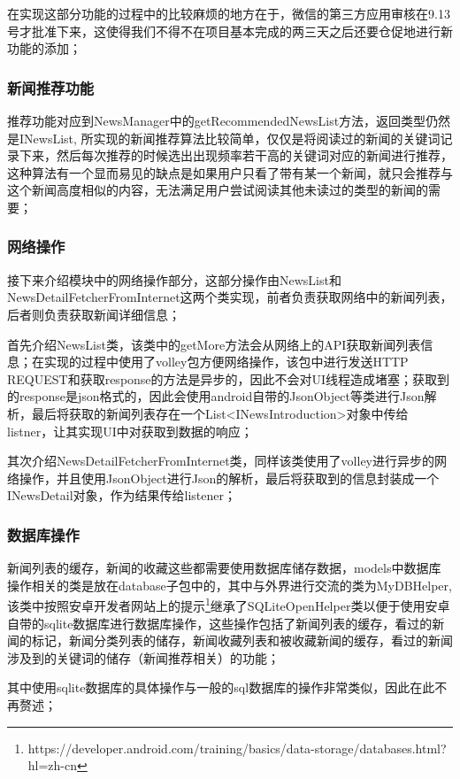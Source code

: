 \documentclass[UTF8]{ctexart}
\begin{document}
		在实现这部分功能的过程中的比较麻烦的地方在于，微信的第三方应用审核在9.13号才批准下来，这使得我们不得不在项目基本完成的两三天之后还要仓促地进行新功能的添加；

	\subsubsection{新闻推荐功能}
		推荐功能对应到NewsManager中的getRecommendedNewsList方法，返回类型仍然是INewsList, 所实现的新闻推荐算法比较简单，仅仅是将阅读过的新闻的关键词记录下来，然后每次推荐的时候选出出现频率若干高的关键词对应的新闻进行推荐，这种算法有一个显而易见的缺点是如果用户只看了带有某一个新闻，就只会推荐与这个新闻高度相似的内容，无法满足用户尝试阅读其他未读过的类型的新闻的需要；

	\subsubsection{网络操作}
		接下来介绍模块中的网络操作部分，这部分操作由NewsList和NewsDetailFetcherFromInternet这两个类实现，前者负责获取网络中的新闻列表，后者则负责获取新闻详细信息；

		首先介绍NewsList类，该类中的getMore方法会从网络上的API获取新闻列表信息；在实现的过程中使用了volley包方便网络操作，该包中进行发送HTTP REQUEST和获取response的方法是异步的，因此不会对UI线程造成堵塞；获取到的response是json格式的，因此会使用android自带的JsonObject等类进行Json解析，最后将获取的新闻列表存在一个List<INewsIntroduction>对象中传给listner，让其实现UI中对获取到数据的响应；

		其次介绍NewsDetailFetcherFromInternet类，同样该类使用了volley进行异步的网络操作，并且使用JsonObject进行Json的解析，最后将获取到的信息封装成一个INewsDetail对象，作为结果传给listener；

	\subsubsection{数据库操作}
		新闻列表的缓存，新闻的收藏这些都需要使用数据库储存数据，models中数据库操作相关的类是放在database子包中的，其中与外界进行交流的类为MyDBHelper, 该类中按照安卓开发者网站上的提示\footnote{https://developer.android.com/training/basics/data-storage/databases.html?hl=zh-cn}继承了SQLiteOpenHelper类以便于使用安卓自带的sqlite数据库进行数据库操作，这些操作包括了新闻列表的缓存，看过的新闻的标记，新闻分类列表的储存，新闻收藏列表和被收藏新闻的缓存，看过的新闻涉及到的关键词的储存（新闻推荐相关）的功能；

		其中使用sqlite数据库的具体操作与一般的sql数据库的操作非常类似，因此在此不再赘述；
\end{document}
